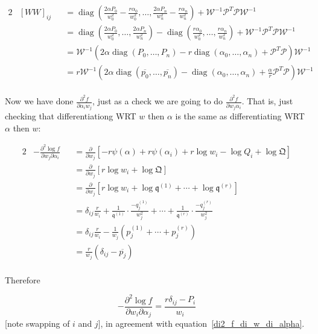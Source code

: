 \documentclass[nojss]{jss}
\DeclareMathOperator{\diag}{diag}
\begin{document}
\begin{alignat}{2}
&  [WW]_{ij} &&=\diag\left(\frac{2\alpha P_0}{w_0^2} - \frac{r\alpha_0}{w_0^2},\ldots,
\frac{2\alpha P_n}{w_n^2} - \frac{r\alpha_n}{w_n^2}\right) + \mathcal{W}^{-1}\mathcal{P}^T\mathcal{P}\mathcal{W}^{-1}\\
& &&=   \diag\left(\frac{2\alpha P_0}{w_0^2},\ldots,\frac{2\alpha P_n}{w_n^2}\right)-
\diag\left(\frac{r\alpha_0}{w_0^2},\ldots,\frac{r\alpha_n}{w_n^2}\right)+ \mathcal{W}^{-1}\mathcal{P}^T\mathcal{P}\mathcal{W}^{-1}\\
& &&=   \mathcal{W}^{-1}\left(2\alpha\diag\left(P_0,\ldots,P_n\right)-r
\diag\left(\alpha_0,\ldots,\alpha_n\right)+ \mathcal{P}^T\mathcal{P}\right)\mathcal{W}^{-1}\\
& &&=   r\mathcal{W}^{-1}\left(2\alpha\diag\left(\overline{p_0},\ldots,\overline{p_n}\right)-\diag\left(\alpha_0,\ldots,\alpha_n\right)+ \frac{\alpha}{r}\mathcal{P}^T\mathcal{P}\right)\mathcal{W}^{-1}\\
\end{alignat}

Now we have done $\frac{\partial^2f}{\partial\alpha_iw_j}$, just as a
check we are going to do $\frac{\partial^2f}{\partial w_j\alpha_i}$.
That is, just checking that differentiationg WRT $w$ then $\alpha$ is
the same as differentiating WRT $\alpha$ then $w$:

\begin{alignat}{2}
& -\frac{\partial^2\log f}{\partial w_j\partial\alpha_i}&&=
 \frac{\partial}{\partial w_j}\left[ -r\psi(\alpha)+r\psi(\alpha_i)+r\log w_i-\log Q_i +\log\mathfrak{Q}\right]\\
  & && = \frac{\partial}{\partial w_j}\left[r\log w_i+\log\mathfrak{Q}\right]\\
  & && = \frac{\partial}{\partial w_j}\left[r\log
   w_i+\log\mathfrak{q}^{(1)} 
   +\cdots+ 
      \log\mathfrak{q}^{(r)} 
   \right]\\
 & &&=
\delta_{ij} \frac{r}{w_i}  +
 \frac{1}{\mathfrak{q}^{(1)}}\cdot\frac{-q_j^{(1)}}{w_j^2}
 +\cdots+
 \frac{1}{\mathfrak{q}^{(r)}}\cdot\frac{-q_j^{(r)}}{w_j^2}\\
 & &&=
\delta_{ij} \frac{r}{w_i} -
\frac{1}{w_j}\left(p_j^{(1)}+\cdots+ p_j^{(r)}\right) \\
 & &&=\frac{r}{w_j}(\delta_{ij}-\overline{p_j})\\
  \end{alignat}

Therefore 

\begin{equation}\label{WA}
  -\frac{\partial^2\log f}{\partial w_i\partial\alpha_j} =\frac{r\delta_{ij}-P_i}{w_i}
  \end{equation}
[note swapping of $i$ and $j$], in agreement with
equation~\ref{di2_f_di_w_di_alpha}.
\end{document}
